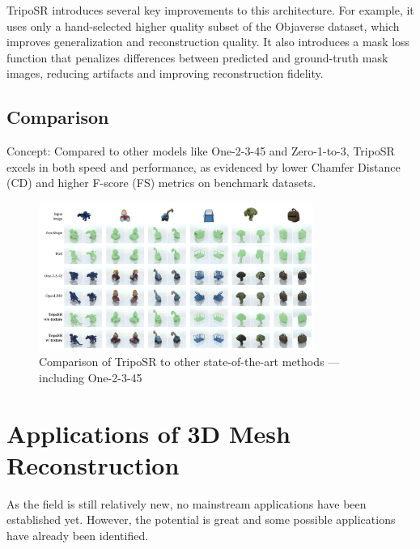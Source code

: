 TripoSR introduces several key improvements to this architecture. For example, it uses only a hand-selected higher quality subset of the Objaverse dataset, which improves generalization and reconstruction quality. It also introduces a mask loss function that penalizes differences between predicted and ground-truth mask images, reducing artifacts and improving reconstruction fidelity.

\subsection{Comparison}

Concept:
Compared to other models like One-2-3-45 and Zero-1-to-3, TripoSR excels in both speed and performance, as evidenced by lower Chamfer Distance (CD) and higher F-score (FS) metrics on benchmark datasets.

\begin{figure}
    \centering
    \includegraphics[width=0.8\textwidth]{images/comparison_tripo.jpg}
    \caption{Comparison of TripoSR to other state-of-the-art methods — including One-2-3-45 \autocite{tochilkin_triposr_2024}}
    \label{fig:comparison-tripo}
\end{figure}

\section{Applications of 3D Mesh Reconstruction}
As the field is still relatively new, no mainstream applications have been established yet. However, the potential is great and some possible applications have already been identified.

